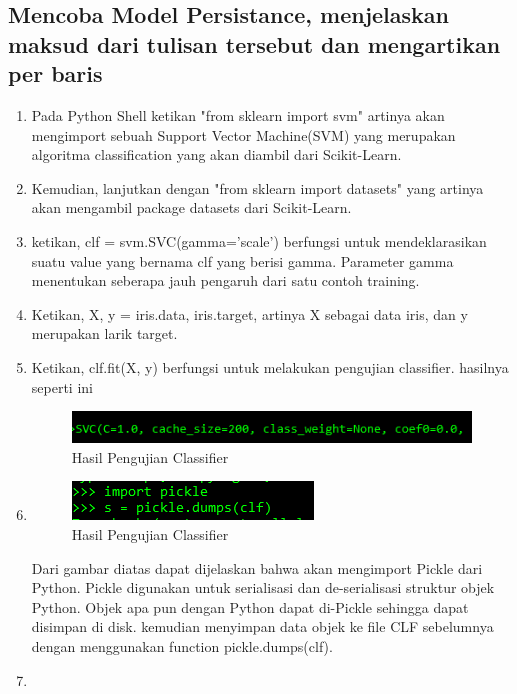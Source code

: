 \subsection{Mencoba Model Persistance, menjelaskan maksud dari tulisan tersebut dan mengartikan per baris}
\begin{enumerate}
\item
Pada Python Shell ketikan "from sklearn import svm" artinya akan mengimport sebuah Support Vector Machine(SVM) yang merupakan algoritma classification yang akan diambil dari Scikit-Learn.
\item
Kemudian, lanjutkan dengan "from sklearn import datasets" yang artinya akan mengambil package datasets dari Scikit-Learn.
\item
ketikan, clf = svm.SVC(gamma='scale') berfungsi untuk mendeklarasikan suatu value yang bernama clf yang berisi gamma. Parameter gamma menentukan seberapa jauh pengaruh dari satu contoh training.
\item
Ketikan, X, y = iris.data, iris.target, artinya X sebagai data iris, dan y merupakan larik target.
\item
Ketikan, clf.fit(X, y) berfungsi untuk melakukan pengujian classifier. hasilnya seperti ini
\begin{figure}
	\begin{center}
   	 \includegraphics[scale=1]{figures/aip7.png}
   	 \caption{Hasil Pengujian Classifier}	
	\end{center}
\end{figure}
\item
\begin{figure}
	\begin{center}
   	 \includegraphics[scale=1]{figures/aip8.png}
   	 \caption{Hasil Pengujian Classifier}	
	\end{center}
\end{figure}
Dari gambar diatas dapat dijelaskan bahwa akan mengimport Pickle dari Python. Pickle digunakan untuk serialisasi dan de-serialisasi struktur objek Python. Objek apa pun dengan Python dapat di-Pickle sehingga dapat disimpan di disk. kemudian menyimpan data objek ke file CLF sebelumnya dengan menggunakan function pickle.dumps(clf).
\item

\end{enumerate}
